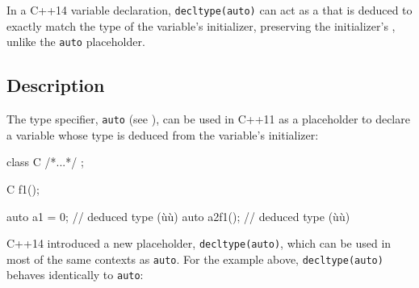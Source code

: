 

\label{deducing-types-using-decltype-semantics}
\setcounter{table}{0}
\setcounter{footnote}{0}
\setcounter{lstlisting}{0}


In a C++14 variable declaration, \lstinline!decltype(auto)! can act as a
 that is deduced to exactly match the type of
the variable's initializer, preserving the initializer's , unlike the \lstinline!auto! placeholder.

\subsection[Description]{Description}\label{description}

The type specifier, \lstinline!auto! (see ),
can be used in C++11 as a placeholder to declare a variable whose type
is deduced from the variable's initializer:

\begin{emcppslisting}[emcppsbatch=e1]
class C { /*...*/ };

C f1();

auto a1 = 0;    // deduced type (ù{}ù)
auto a2{f1()};  // deduced type (ù{}ù)
\end{emcppslisting}
    

C++14 introduced a new placeholder, \lstinline!decltype(auto)!, which can
be used in most of the same contexts as \lstinline!auto!. For the example
above, \lstinline!decltype(auto)! behaves identically to \lstinline!auto!:

